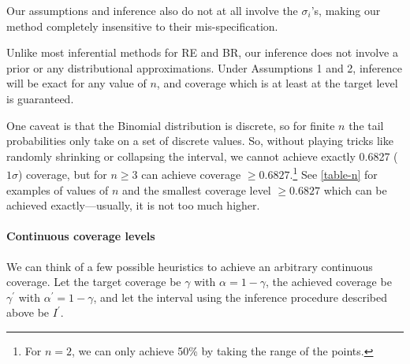 \documentclass[letterpaper,12pt]{article}
\begin{document}
Our assumptions and inference also do not at all involve the $\sigma_i$'s, making our method completely insensitive to their mis-specification.

Unlike most inferential methods for RE and BR, our inference does not involve a prior or any distributional approximations. Under Assumptions 1 and 2, inference will be exact for any value of $n$, and coverage which is at least at the target level is guaranteed.

One caveat is that the Binomial distribution is discrete, so for finite $n$ the tail probabilities only take on a set of discrete values. So, without playing tricks like randomly shrinking or collapsing the interval, we cannot achieve exactly 0.6827 ($1\sigma$) coverage, but for $n\geq 3$ can achieve coverage $\geq 0.6827$.\footnote{For $n=2$, we can only achieve 50\% by taking the range of the points.} See \ref{table-n} for examples of values of $n$ and the smallest coverage level $\geq0.6827$ which can be achieved exactly---usually, it is not too much higher.

\paragraph{Continuous coverage levels} We can think of a few possible heuristics to achieve an arbitrary continuous coverage. Let the target coverage be $\gamma$ with $\alpha=1-\gamma$, the achieved coverage be $\gamma^\prime$ with $\alpha^\prime=1-\gamma$, and let the interval using the inference procedure described above be $I^\prime$.
\end{document}
